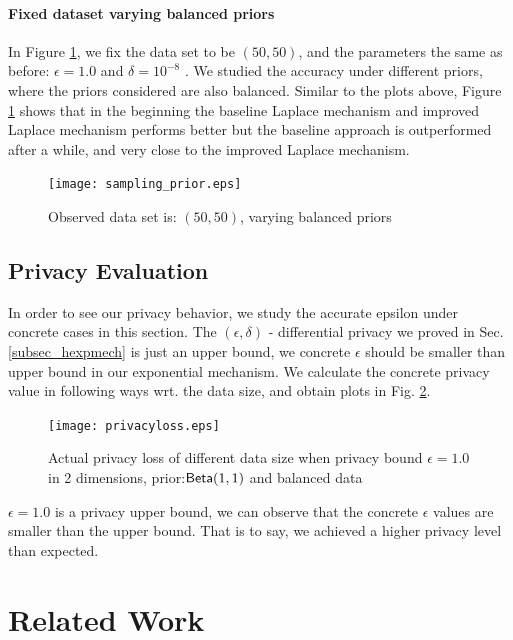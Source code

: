 \documentclass{article}
\begin{document}
\paragraph{Fixed dataset varying balanced priors}
\label{subsubsec_vs_prior}
In Figure \ref{fig_vs_prior}, we fix the data set to be $(50,50)$, and the parameters the same as before: $\epsilon = 1.0$ and $\delta = 10^{-8}$ . We studied the accuracy under different priors, where the priors considered  are also balanced.
Similar to the plots above, Figure \ref{fig_vs_prior} shows that in the beginning the baseline Laplace mechanism and improved Laplace mechanism performs better but the baseline approach is outperformed after a while, and very close to the improved Laplace mechanism.
\begin{figure}
\centering
\texttt{[image: sampling\_prior.eps]}
\caption{Observed data set is: $(50,50)$, varying balanced priors}
\label{fig_vs_prior}
\end{figure}

\subsection{Privacy Evaluation}
\label{subsec_experiment_privacy}
In order to see our privacy behavior, we study the accurate epsilon under concrete cases in this section. The $(\epsilon, \delta)$ - differential privacy we proved in Sec. \ref{subsec_hexpmech} is just an upper bound, we concrete $\epsilon$ should be smaller than upper bound in our exponential mechanism. We calculate the concrete privacy value in following ways wrt. the data size, and obtain plots in Fig. \ref{fig_privacy}.

\begin{figure}
\begin{center}
\centering
    \texttt{[image: privacyloss.eps]}
\caption{Actual privacy loss of different data size when privacy bound $\epsilon = 1.0$ in 2 dimensions, prior:$\mathsf{Beta}(1,1)$ and balanced data}
\label{fig_privacy}
\end{center}
\end{figure}

$\epsilon = 1.0$ is a privacy upper bound, we can observe that the concrete $\epsilon$ values are smaller than the upper bound. That is to say, we achieved a higher privacy level than expected. 



\section{Related Work}
\end{document}
